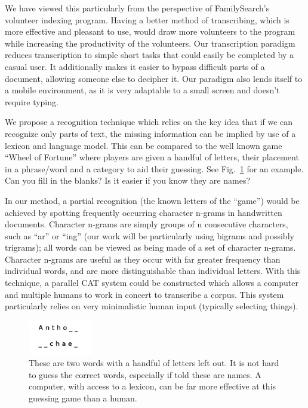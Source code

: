 \documentclass[ms]{byuprop}
\begin{document}
We have viewed this particularly from the perspective of FamilySearch's volunteer indexing program. Having a better method of transcribing, which is more effective and pleasant to use, would  draw more volunteers to the program while increasing the productivity of the volunteers. Our transcription paradigm reduces transcription to simple short tasks that could easily be completed by a casual user. It additionally makes it easier to bypass difficult parts of a document, allowing someone else to decipher it. Our paradigm also lends itself to a mobile environment, as it is very adaptable to a small screen and doesn't require typing.

We propose a recognition technique which relies on the key idea that if we can recognize only parts of text, the missing information can be implied by use of a lexicon and language model. This can be compared to the well known game ``Wheel of Fortune'' where players are given a handful of letters, their placement in a phrase/word and a category to aid their guessing. See Fig.~\ref{fig:wheel_of_fortune_example} for an example. Can you fill in the blanks? Is it easier if you know they are names?

In our method, a partial recognition (the known letters of the ``game'') would be achieved by spotting frequently occurring character n-grams in handwritten documents. Character n-grams are simply groups of n consecutive characters, such as ``ar'' or ``ing'' (our work will be particularly using bigrams and possibly trigrams); all words can be viewed as being made of a set of character n-grams. Character n-grams are useful as they occur with far greater frequency than individual words, and are more distinguishable than individual letters. With this technique, a parallel CAT system could be constructed which allows a computer and multiple humans to work in concert to transcribe a corpus. This system particularly relies on very minimalistic human input (typically selecting things).

\begin{figure}[h]
    \centering
    \includegraphics[width=0.25\textwidth]{wheel_of_fortune_example}
    \caption{These are two words with a handful of letters left out. It is not hard to guess the correct words, especially if told these are names. A computer, with access to a lexicon, can be far more effective at this guessing game than a human.}
    \label{fig:wheel_of_fortune_example}
\end{figure}
\end{document}
